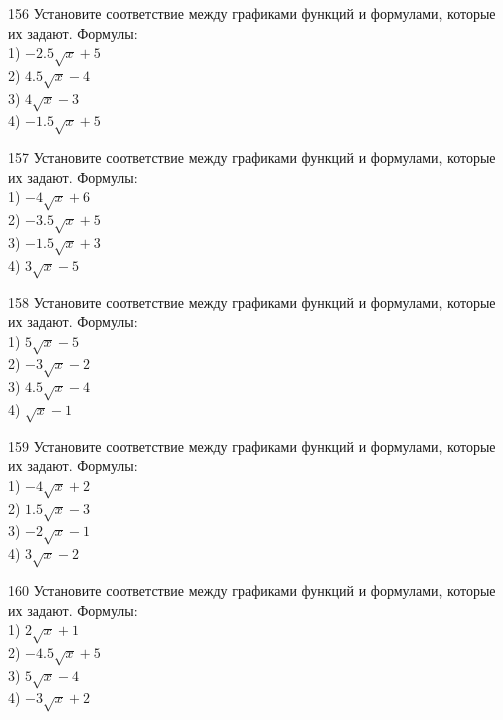 \documentclass[4apaper]{article}
\begin{document}
\begin{taskBN}{156}
Установите соответствие между графиками функций и формулами, которые их задают. Формулы: \\1) $-2.5\sqrt{x}+5$\\2) $4.5\sqrt{x}-4$\\3) $4\sqrt{x}-3$\\4) $-1.5\sqrt{x}+5$
\end{taskBN}

\begin{taskBN}{157}
Установите соответствие между графиками функций и формулами, которые их задают. Формулы: \\1) $-4\sqrt{x}+6$\\2) $-3.5\sqrt{x}+5$\\3) $-1.5\sqrt{x}+3$\\4) $3\sqrt{x}-5$
\end{taskBN}

\begin{taskBN}{158}
Установите соответствие между графиками функций и формулами, которые их задают. Формулы: \\1) $5\sqrt{x}-5$\\2) $-3\sqrt{x}-2$\\3) $4.5\sqrt{x}-4$\\4) $\sqrt{x}-1$
\end{taskBN}

\begin{taskBN}{159}
Установите соответствие между графиками функций и формулами, которые их задают. Формулы: \\1) $-4\sqrt{x}+2$\\2) $1.5\sqrt{x}-3$\\3) $-2\sqrt{x}-1$\\4) $3\sqrt{x}-2$
\end{taskBN}

\begin{taskBN}{160}
Установите соответствие между графиками функций и формулами, которые их задают. Формулы: \\1) $2\sqrt{x}+1$\\2) $-4.5\sqrt{x}+5$\\3) $5\sqrt{x}-4$\\4) $-3\sqrt{x}+2$
\end{taskBN}
\end{document}
